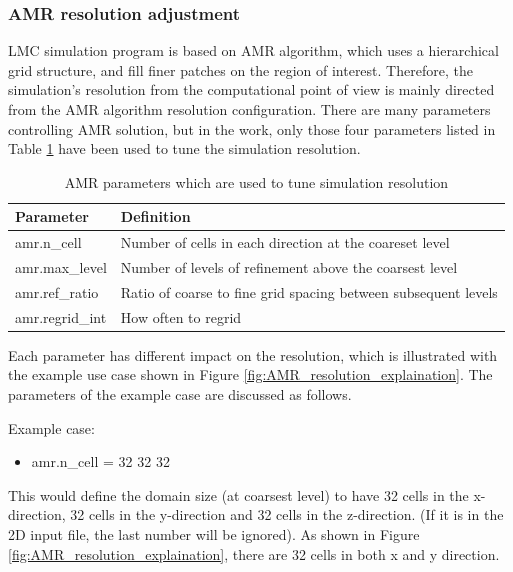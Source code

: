 \subsubsection{AMR resolution adjustment}
LMC simulation program is based on AMR algorithm, which uses a hierarchical grid structure, and fill finer patches on the region of interest. Therefore, the simulation’s resolution from the computational point of view is mainly directed from the AMR algorithm resolution configuration. There are many parameters controlling AMR solution, but in the work, only those four parameters listed in Table \ref{table:table_tune_resolution} have been used to tune the simulation resolution. 


\begin{table}[H]
\begin{center}
\begin{tabular}{|l|l|}
	\hline
	\textbf{Parameter} & \textbf{Definition}\\ \hline
    amr.n\_cell & Number of cells in each direction at the coareset level\\ 		\hline
    amr.max\_level & Number of levels of refinement above the coarsest level\\
	\hline
    amr.ref\_ratio & Ratio of coarse to fine grid spacing between subsequent levels\\
    \hline
    amr.regrid\_int & How often to regrid\\
    \hline
\end{tabular}
\caption{AMR parameters which are used to tune simulation resolution}
\label{table:table_tune_resolution}
\end{center}
\end{table}

Each parameter has different impact on the resolution, which is illustrated with the example use case shown in Figure \ref{fig:AMR_resolution_explaination}. The parameters of the example case are discussed as follows.

Example case:
\begin{itemize}
\item amr.n\_cell = 32 32 32
\end{itemize}
This would define the domain size (at coarsest level) to have 32 cells in the x-direction, 32 cells in the y-direction and 32 cells in the z-direction. (If it is in the 2D input file, the last number will be ignored). As shown in Figure \ref{fig:AMR_resolution_explaination}, there are 32 cells in both x and y direction.

